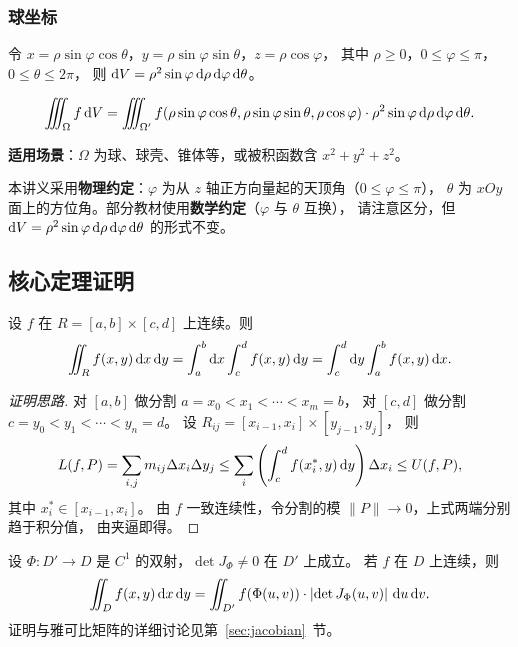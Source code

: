 \documentclass{ctexart}
\begin{document}
\subsubsection*{球坐标}

令 $x = \rho\sin\varphi\cos\theta$，$y = \rho\sin\varphi\sin\theta$，$z = \rho\cos\varphi$，
其中 $\rho \ge 0$，$0 \le \varphi \le \pi$，$0 \le \theta \le 2\pi$，
则 $\mathrm{d} V = \rho^2 \sin\varphi \,\mathrm{d} \rho\,\mathrm{d} \varphi\,\mathrm{d} \theta$。

\[
  \iiint_\Omega f \,\mathrm{d} V
  = \iiint_{\Omega'} f(\rho\sin\varphi\cos\theta, \rho\sin\varphi\sin\theta, \rho\cos\varphi)
    \cdot \rho^2 \sin\varphi \,\mathrm{d} \rho\,\mathrm{d} \varphi\,\mathrm{d} \theta.
\]

\textbf{适用场景}：$\Omega$ 为球、球壳、锥体等，或被积函数含 $x^2+y^2+z^2$。

\begin{remark}
  本讲义采用\textbf{物理约定}：$\varphi$ 为从 $z$ 轴正方向量起的天顶角（$0 \le \varphi \le \pi$），
  $\theta$ 为 $xOy$ 面上的方位角。部分教材使用\textbf{数学约定}（$\varphi$ 与 $\theta$ 互换），
  请注意区分，但 $\mathrm{d} V = \rho^2 \sin\varphi \,\mathrm{d} \rho\,\mathrm{d} \varphi\,\mathrm{d} \theta$ 的形式不变。
\end{remark}

\subsection{核心定理证明}

\begin{theorem}[矩形区域上化重积分为累次积分]
  设 $f$ 在 $R = [a,b] \times [c,d]$ 上连续。则
  \[
    \iint_R f(x,y) \,\mathrm{d} x\,\mathrm{d} y
    = \int_a^b \mathrm{d} x \int_c^d f(x,y) \,\mathrm{d} y
    = \int_c^d \mathrm{d} y \int_a^b f(x,y) \,\mathrm{d} x.
  \]
\end{theorem}

\begin{proof}[证明思路]
  对 $[a,b]$ 做分割 $a = x_0 < x_1 < \cdots < x_m = b$，
  对 $[c,d]$ 做分割 $c = y_0 < y_1 < \cdots < y_n = d$。
  设 $R_{ij} = [x_{i-1},x_i] \times [y_{j-1},y_j]$，
  则
  \[
    L(f,P) = \sum_{i,j} m_{ij} \Delta x_i \Delta y_j
    \le \sum_i \left( \int_c^d f(x_i^*, y) \,\mathrm{d} y \right) \Delta x_i
    \le U(f,P),
  \]
  其中 $x_i^* \in [x_{i-1}, x_i]$。
  由 $f$ 一致连续性，令分割的模 $\|P\| \to 0$，上式两端分别趋于积分值，
  由夹逼即得。
\end{proof}

\begin{theorem}[重积分的变量替换]
  设 $\Phi: D' \to D$ 是 $C^1$ 的双射，$\det J_\Phi \ne 0$ 在 $D'$ 上成立。
  若 $f$ 在 $D$ 上连续，则
  \[
    \iint_D f(x,y) \,\mathrm{d} x\,\mathrm{d} y
    = \iint_{D'} f(\Phi(u,v)) \cdot \left| \det J_\Phi(u,v) \right| \,\mathrm{d} u\,\mathrm{d} v.
  \]
  证明与雅可比矩阵的详细讨论见第~\ref{sec:jacobian}~节。
\end{theorem}
\end{document}
